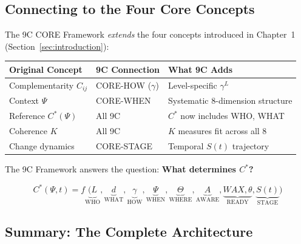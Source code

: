 \subsection{Connecting to the Four Core Concepts}
\label{sec:8c-connect}

The 9C CORE Framework \emph{extends} the four concepts introduced in
Chapter~1 (Section~\ref{sec:introduction}):

\begin{center}
\renewcommand{\arraystretch}{1.3}
\begin{tabular}{@{}lll@{}}
\toprule
\textbf{Original Concept} & \textbf{9C Connection} & \textbf{What 9C Adds} \\
\midrule
Complementarity $C_{ij}$ & CORE-HOW ($\gamma$) & Level-specific $\gamma^L$ \\
Context $\Psi$ & CORE-WHEN & Systematic 8-dimension structure \\
Reference $C^*(\Psi)$ & All 9C & $C^*$ now includes WHO, WHAT \\
Coherence $K$ & All 9C & $K$ measures fit across all 8 \\
Change dynamics & CORE-STAGE & Temporal $S(t)$ trajectory \\
\bottomrule
\end{tabular}
\end{center}

The 9C Framework answers the question: \textbf{What determines $C^*$?}

\begin{equation}
C^*(\Psi, t) = f\underbrace{(L}_{\text{WHO}}, \underbrace{d}_{\text{WHAT}}, \underbrace{\gamma}_{\text{HOW}}, \underbrace{\Psi}_{\text{WHEN}}, \underbrace{\Theta}_{\text{WHERE}}, \underbrace{A}_{\text{AWARE}}, \underbrace{WAX, \theta}_{\text{READY}}, \underbrace{S(t)}_{\text{STAGE}})
\end{equation}

\subsection{Summary: The Complete Architecture}
\label{sec:8c-summary}

